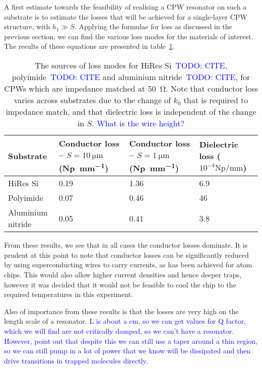 \documentclass[a4paper]{article}
\newcommand{\cm}[1]{\textcolor{blue}{#1}} %
\begin{document}
A first estimate towards the feasibility of realising a CPW resonator on such a
substrate is to estimate the losses that will be achieved for a single-layer CPW
structure, with $h_1 \gg S$. Applying the formulae for loss as discussed in the
previous section, we can find the various loss modes for the materials of
interest. The results of these equations are presented in
table~\ref{table:losses}.

\begin{table}[h]
  \begin{tabularx}{\textwidth}{lXXX}
    Substrate &
    Conductor loss -- $S=\SI{10}{\micro\meter}$ (\si{\neper \per \milli \meter})
    & Conductor loss -- $S=\SI{1}{\micro\meter}$ (\si{\neper \per \milli \meter})
    & Dielectric loss ($10^{-4}\si{\neper \per \milli \meter}$) \\
    \hline
    HiRes Si & 0.19 & 1.36 & 6.9 \\
    Polyimide & 0.07 & 0.46 & 46 \\
    Aluminium nitride & 0.05 & 0.41 & 3.8
  \end{tabularx}
  \caption{The sources of loss modes for HiRes Si~\cm{TODO: CITE}, polyimide~\cm{TODO: CITE}
  and aluminium nitride~\cm{TODO: CITE}, for CPWs which are impedance matched at
  \SI{50}{\ohm}. Note that conductor loss varies across substrates due to the
  change of $k_0$ that is required to impedance match, and that dielectric loss
    is independent of the change in $S$. \cm{What is the wire height?}}
    \label{table:losses}
\end{table}

From these results, we see that in all cases the conductor losses dominate.  It
  is prudent at this point to note that conductor losses can be significantly
  reduced by using superconducting wires to carry currents, as has been achieved
  for atom chips\cite{PhysRevLett.97.200405, Hattermann2017}. This would also
  allow higher current densities and hence deeper traps, however it was decided
  that it would not be feasible to cool the chip to the required temperatures in
  this experiment.

Also of importance from these results is that the losses are very high on the
  length scale of a resonator. \cm{L is about a cm, so we can get values for Q
  factor, which we will find are not critically damped, so we can't have a
  resonator. However, point out that despite this we can still use a taper
  around a thin region, so we can still pump in a lot of power that we know will
  be dissipated and then drive transitions in trapped molecules directly.}




\end{document}
